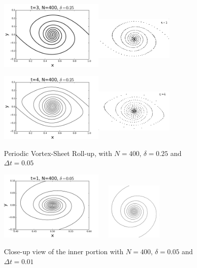 \documentclass[12pt,twoside]{article}
\begin{document}
\begin{figure}
\begin{center}
	\includegraphics[width=2in,height=1.33in]{K9.pdf}\includegraphics[width=1.5in,height=1.2in]{periodic23.png}

	\includegraphics[width=2in,height=1.33in]{K10.pdf}\includegraphics[width=1.5in,height=1.2in]{periodic24.png}
\end{center}
\caption{Periodic Vortex-Sheet Roll-up, with $N=400$, $\delta=0.25$ and $\Delta t=0.05$}
\end{figure}
\begin{figure}
\begin{center}
	\includegraphics[width=2in,height=1.33in]{k11.pdf}\includegraphics[width=1.5in,height=1.1in]{periodiccloseup.png}\\

\end{center}

\caption{Close-up view of the inner portion with $N=400$, $\delta=0.05$ and $\Delta t=0.01$}
\end{figure}
\clearpage
\end{document}
